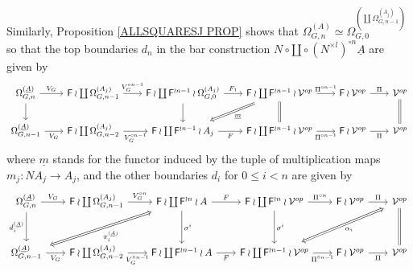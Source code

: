 \documentclass[a4paper,10pt]{article}%
\begin{document}
Similarly, Proposition \ref{ALLSQUARESJ PROP} shows that
$\Omega_{G,n}^{(A)} \simeq
\Omega_{G,0}^{\left( \coprod \Omega_{G,n-1}^{(A_j)} \right)}$
so that the top boundaries $d_n$ in the bar construction
$N \circ \amalg \circ (N^{\times l})^{\circ n} \underline{A}$
are given by
\begin{equation}
	\begin{tikzcd}[column sep=2em]
	\Omega_{G,n}^{(\underline{A})} \ar{d} \ar{r}{V_G} &
	\Fin \wr \coprod \Omega_{G,n-1}^{(A_j)} \ar{r}{V_G^{\circ n-1}}&
	\Fin \wr \coprod \Fin^{\wr n-1} \wr \Omega_{G,0}^{(A_j)} \ar{r}{F_1} \ar{d}&
	|[alias=dog2]|
	\Fin \wr \coprod \Fin^{\wr n-1} \wr \mathcal{V}^{op} \ar{r}{\Pi^{\circ n-1}}  \ar[equal]{d} &
	\Fin \wr \mathcal{V}^{op} \ar{r}{\Pi} &
	\mathcal{V}^{op} \ar[equal]{d}
\\
	\Omega_{G,n-1}^{(\underline{A})} \ar{r}[swap]{V_G} &
	\Fin \wr \coprod \Omega_{G,n-2}^{(A_j)} \ar{r}[swap]{V_G^{\circ n-1}}&
	|[alias=cat3]|
	\Fin \wr \coprod \Fin^{\wr n-1} \wr A_j \ar{r}[swap]{F} &
	\Fin \wr \coprod \Fin^{\wr n-1} \wr \mathcal{V}^{op} \ar{r}[swap]{\Pi^{\circ n-1}} &
	\Fin \wr \mathcal{V}^{op} \ar{r}[swap]{\Pi} &
	|[alias=dog]|
	\mathcal{V}^{op}
	\arrow[Rightarrow, from=dog2, to=cat3,shorten <=0.15cm,,shorten >=0.15cm,"\underline{m}"]
	\end{tikzcd}
\end{equation}
where $\underline{m}$ stands for the functor induced by the tuple of multiplication maps $m_j \colon N A_j \to A_j$, 
and the other boundaries $d_i$ for $0 \leq i < n$ are given by
\begin{equation}\label{DISJBARDN EQ}
	\begin{tikzcd}[column sep=2em,row sep=3em]
	\Omega_{G,n}^{(\underline{A})} 
	\ar{d}[swap]{d_i^{(\underline{A})}} \ar{r}{V_G} &
	\Fin \wr \coprod \Omega_{G,n-1}^{(A_j)} \ar{r}{V_G^{\circ n}} &
	|[alias=dog2]|
	\Fin \wr \coprod \Fin^{\wr n} \wr A \ar{r}{F} \ar{d}{\sigma^i}&
	\Fin \wr \coprod \Fin^{\wr n} \wr \mathcal{V}^{op} \ar{r}{\Pi^{\circ n}}  \ar{d}{\sigma^i} &
	\Fin \wr \mathcal{V}^{op} \ar{r}{\Pi} &
	|[alias=dog3]|
	\mathcal{V}^{op} \ar[equal]{d}
\\
	|[alias=cat3]|
	\Omega_{G,n-1}^{(\underline{A})} \ar{r}[swap]{V_G} &
	\Fin \wr \coprod \Omega_{G,n-2}^{(A_j)} \ar{r}[swap]{V_G^{\circ n-1}}&
	\Fin \wr \coprod \Fin^{\wr n-1} \wr A \ar{r}[swap]{F} &
	|[alias=cat2]|
	\Fin \wr \coprod \Fin^{\wr n-1} \wr \mathcal{V}^{op} \ar{r}[swap]{\Pi^{\circ n-1}} &
	\Fin \wr \mathcal{V}^{op} \ar{r}[swap]{\Pi} &
	\mathcal{V}^{op}
	\arrow[Leftrightarrow, from=dog2, to=cat3,shorten <=0.15cm,,shorten >=0.15cm,"\pi_i^{(\underline{A})}"]
	\arrow[Leftrightarrow, from=dog3, to=cat2,shorten <=0.15cm,,shorten >=0.15cm,"\alpha_i"]
	\end{tikzcd}
\end{equation}
\end{document}
